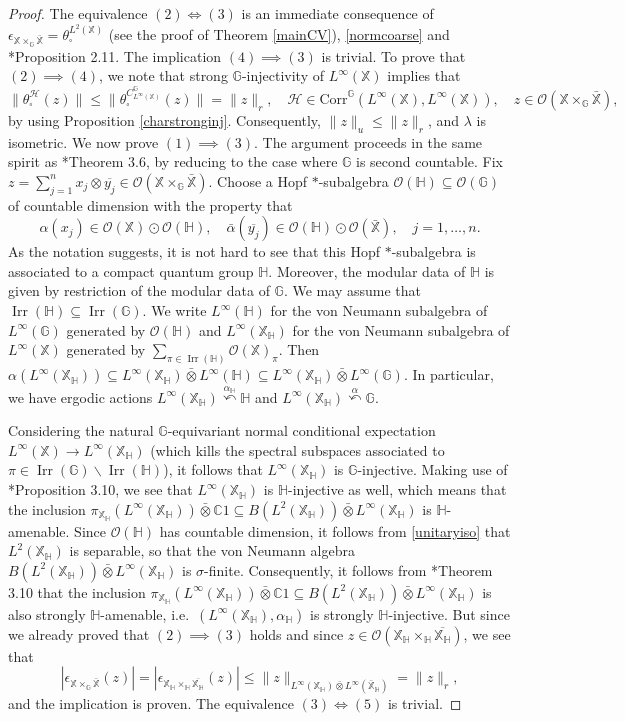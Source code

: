 \documentclass[reqno]{amsart}
\numberwithin{equation}{section}
\newcommand\XGX{\X\times_\G \bar{\X}}
\DeclareMathOperator{\Irr}{\mathrm{Irr}}
\renewcommand{\H}{\mathbb{H}}
\newcommand{\mcH}{\mathcal{H}}
\newcommand{\mcO}{\mathcal{O}}
\newcommand{\C}{\mathbb{C}}
\newcommand{\G}{\mathbb{G}}
\newcommand{\X}{\mathbb{X}}
\newcommand{\Corr}{\mathrm{Corr}}
\newcommand{\ovot}{\bar{\otimes}}
\begin{document}
\begin{proof} The equivalence $(2) \iff (3)$ is an immediate consequence of $\epsilon_{\XGX}= \theta_\square^{L^2(\X)}$ (see the proof of Theorem \ref{mainCV}), \eqref{normcoarse} and \cite{DCDR25}*{Proposition 2.11}. The implication $(4)\implies (3)$ is trivial. To prove that $(2)\implies (4)$, we note that strong $\G$-injectivity of $L^\infty(\X)$ implies that $$\|\theta_\square^\mcH(z)\| \le \|\theta_{\square}^{C_{L^\infty(\X)}^\G}(z)\|= \|z\|_r, \quad \mcH \in \Corr^\G(L^\infty(\X), L^\infty(\X)), \quad z \in \mcO(\XGX),$$
by using Proposition \ref{charstronginj}. Consequently, $\|z\|_u\le \|z\|_r$, and $\lambda$ is isometric. We now prove $(1)\implies (3)$. The argument proceeds in the same spirit as \cite{DCDR25}*{Theorem 3.6}, by reducing to the case where $\G$ is second countable. Fix $z= \sum_{j=1}^n x_j\otimes \overline{y_j}\in \mcO(\XGX)$. 
Choose a Hopf $*$-subalgebra $\mcO(\H)\subseteq \mcO(\G)$ of countable dimension with the property that
$$\alpha(x_j) \in \mcO(\X)\odot \mcO(\H), \quad \bar{\alpha}(\overline{y_j})\in \mcO(\H)\odot \mcO(\bar{\X}), \quad j=1, \dots, n.$$
As the notation suggests, it is not hard to see that this Hopf $*$-subalgebra is associated to a compact quantum group $\H$. Moreover, the modular data of $\H$ is given by restriction of the modular data of $\G$. We may assume that $\Irr(\H)\subseteq \Irr(\G)$. We write $L^\infty(\H)$ for the von Neumann subalgebra of $L^\infty(\G)$ generated by $\mcO(\H)$ and $L^\infty(\X_\H)$ for the von Neumann subalgebra of $L^\infty(\X)$ generated by $\sum_{\pi \in \Irr(\H)} \mcO(\X)_\pi$. Then $\alpha(L^\infty(\X_\H))\subseteq L^\infty(\X_\H) \ovot L^\infty(\H)\subseteq L^\infty(\X_\H)\ovot L^\infty(\G)$. In particular, we have ergodic actions $L^\infty(\X_\H)\stackrel{\alpha_\H}\curvearrowleft \H$ and $L^\infty(\X_\H)\stackrel{\alpha}\curvearrowleft \G$.

Considering the natural $\G$-equivariant normal conditional expectation $L^\infty(\X)\to L^\infty(\X_\H)$ (which kills the spectral subspaces associated to $\pi \in \Irr(\G)\backslash \Irr(\H)$), it follows that $L^\infty(\X_\H)$ is $\G$-injective. Making use of \cite{DR26}*{Proposition 3.10}, we see that $L^\infty(\X_\H)$ is $\H$-injective as well, which means that the inclusion $\pi_{\X_\H}(L^\infty(\X_\H))\ovot \C1 \subseteq B(L^2(\X_\H))\ovot L^\infty(\X_\H)$ is $\H$-amenable. Since $\mcO(\H)$ has countable dimension, it follows from \eqref{unitaryiso} that $L^2(\X_\H)$ is separable, so that the von Neumann algebra $B(L^2(\X_\H))\ovot L^\infty(\X_\H)$ is $\sigma$-finite. Consequently, it follows from \cite{DCDR25}*{Theorem 3.10} that the inclusion $\pi_{\X_\H}(L^\infty(\X_\H))\ovot \C1 \subseteq B(L^2(\X_\H))\ovot L^\infty(\X_\H)$ is also strongly $\H$-amenable, i.e.\ $(L^\infty(\X_\H), \alpha_\H)$ is strongly $\H$-injective. But since we already proved that $(2)\implies (3)$ holds and since $z\in \mcO(\X_\H\times_{\H}\overline{\X_\H})$, we see that
$$|\epsilon_{\XGX}(z)| = |\epsilon_{\X_\H\times_{\H}\overline{\X_\H}}(z)| \le \|z\|_{L^\infty(\X_\H)\ovot L^\infty(\bar{\X}_\H)} = \|z\|_r,$$
and the implication is proven. The equivalence $(3)\iff (5)$ is trivial.
\end{proof}
\end{document}
